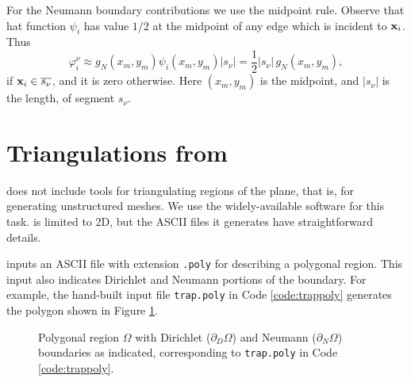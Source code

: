 For the Neumann boundary contributions we use the midpoint rule.  Observe that hat function $\psi_i$ has value $1/2$ at the midpoint of any edge which is incident to $\mathbf{x}_i$.  Thus
\begin{equation}
\varphi_i^\nu \approx g_N(x_m,y_m) \psi_i(x_m,y_m) |s_\nu| = \frac{1}{2} |s_\nu|\, g_N(x_m,y_m), \label{eq:un:segmentmidpoint}
\end{equation}
if $\mathbf{x}_i \in \overline{s_\nu}$, and it is zero otherwise.  Here $(x_m,y_m)$ is the midpoint, and $|s_\nu|$ is the length, of segment $s_\nu$.


\section{Triangulations from \Triangle}

\PETSc does not include tools for triangulating regions of the plane, that is, for generating unstructured meshes.  We use the widely-available \Triangle{} software \citep{Shewchuk1996} for this task.  \Triangle is limited to 2D, but the ASCII files it generates have straightforward details.

\Triangle inputs an ASCII file with extension \texttt{.poly} for describing a polygonal region.  This input also indicates Dirichlet and Neumann portions of the boundary.  For example, the hand-built input file \texttt{trap.poly} in Code \ref{code:trappoly} generates the polygon shown in Figure \ref{fig:un:trap}.

\begin{figure}

\caption{Polygonal region $\Omega$ with Dirichlet ($\partial_D\Omega$) and Neumann ($\partial_N \Omega$) boundaries as indicated, corresponding to \texttt{trap.poly} in Code \ref{code:trappoly}.}
\label{fig:un:trap}
\end{figure}


